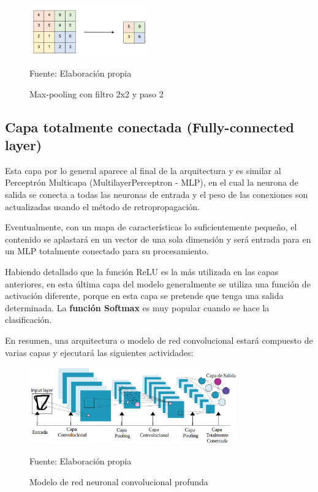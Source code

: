 		\begin{figure}[H]
		\begin{center}
		\includegraphics[width=0.45\textwidth]{images/marcoteorico/pool4}
		\end{center}
		\begin{center}
		\caption{\small{Max-pooling con filtro 2x2 y paso 2}}
		{\small{Fuente: Elaboración propia}}
		\end{center}
		\vspace{-1.5em}
		\end{figure}

	\subsection{Capa totalmente conectada (Fully-connected layer)}

		Esta capa por lo general aparece al final de la arquitectura y es similar al Perceptrón Multicapa (MultilayerPerceptron - MLP), en el cual la neurona de salida se conecta a todas las neuronas de entrada y el peso de las conexiones son actualizadas usando el método de retropropagación.
		
		Eventualmente, con un mapa de características lo suficientemente pequeño, el contenido se aplastará en un vector de una sola dimensión y será entrada para en un MLP totalmente conectado para su procesamiento.
		
		Habiendo detallado que la función ReLU es la más utilizada en las capas anteriores, en esta última capa del modelo generalmente se utiliza una función de activación diferente, porque en esta capa se pretende que tenga una salida determinada. La {\bf función Softmax} es muy popular cuando se hace la clasificación.
	


En resumen, una arquitectura o modelo de red convolucional estará compuesto de varias capas y ejecutará las siguientes actividades:
\begin{figure}[H]
	\begin{center}
	\includegraphics[width=0.8\textwidth]{images/marcoteorico/modelo}
	\end{center}
	\begin{center}
	\caption{\small{Modelo de red neuronal convolucional profunda}}
	{\small{Fuente: Elaboración propia}}
	\end{center}
	\vspace{-1.5em}
	\end{figure}

